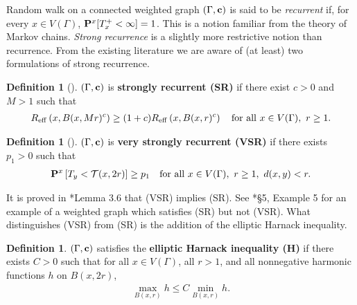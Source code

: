 \documentclass[11pt]{amsart}
\theoremstyle{plain}
\theoremstyle{definition}
\newtheorem{definition}[lemma]{Definition}
\theoremstyle{remark}
\begin{document}
Random walk on a connected weighted graph $(\Gamma,{\bf c})$ is said to be \emph{recurrent} if, for every $x\in V(\Gamma)$, ${\bf P}^x[T_x^+ <\infty]=1$. This is a notion familiar from the theory of Markov chains. \emph{Strong recurrence} is a slightly more restrictive notion than recurrence. From the existing literature we are aware of (at least) two formulations of strong recurrence.

\begin{definition}[\cites{Telcs01,Telcs01_2}]
\label{def:SR}
$(\Gamma, {\bf c})$ is \textbf{strongly recurrent (SR)} if there exist $c>0$ and $M>1$ such that
\begin{align}
R_{\rm eff}\left(x, B(x,Mr)^c\right) \geq (1+c) R_{\rm eff}\left(x, B(x,r)^c\right) \quad \text{for all}~x\in V(\Gamma), ~r\geq 1.
\end{align}
\end{definition}

\begin{definition}[\cites{Delmotte,BarlowValues}]
\label{def:VSR}
$(\Gamma, {\bf c})$ is \textbf{very strongly recurrent (VSR)} if there exists $p_1>0$ such that
\begin{align}
{\bf P}^x\left[T_y< \mathcal{T}(x,2r)\right] \geq p_1 \quad \text{for all}~x\in V(\Gamma),~r\geq 1, ~d(x,y) < r.
\end{align}
\end{definition}

It is proved in \cite{BCK05}*{Lemma 3.6} that (VSR) implies (SR). See \cite{BCK05}*{\S5, Example 5} for an example of a weighted graph which satisfies (SR) but not (VSR). What distinguishes (VSR) from (SR) is the addition of the elliptic Harnack inequality.


\begin{definition}
$(\Gamma, {\bf c})$ satisfies the \textbf{elliptic Harnack inequality (H)} if there exists $C>0$ such that for all $x\in V(\Gamma)$, all $r>1$, and all nonnegative harmonic functions $h$ on $B(x,2r)$,
\begin{align}
\max_{B(x,r)} h \leq C \min_{B(x,r)} h.
\end{align}
\end{definition}

\end{document}
